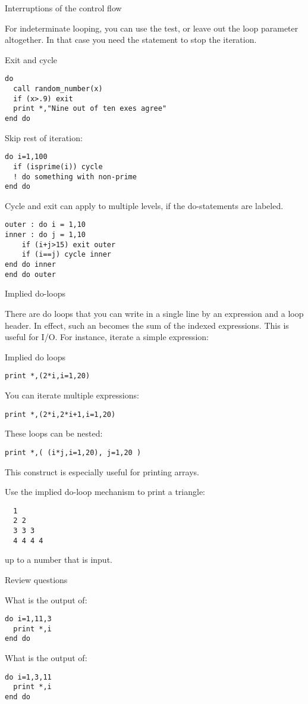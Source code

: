  {Interruptions of the control flow}

For indeterminate looping, you can use the  test,
or leave out the loop parameter altogether.
In that case you need the  statement to stop the iteration.

\begin{block}{Exit and cycle}
  \label{sl:loopexit}
\begin{verbatim}
do
  call random_number(x)
  if (x>.9) exit
  print *,"Nine out of ten exes agree"
end do
\end{verbatim}

Skip rest of iteration:
\begin{verbatim}
do i=1,100
  if (isprime(i)) cycle
  ! do something with non-prime
end do
\end{verbatim}
\end{block}

Cycle and exit can apply to multiple levels, if the do-statements are
labeled.

\begin{verbatim}
outer : do i = 1,10
inner : do j = 1,10
    if (i+j>15) exit outer
    if (i==j) cycle inner
end do inner
end do outer
\end{verbatim}

 {Implied do-loops}
\label{sec:f-impdo}

There are do loops that you can write in a single line by an
expression and a loop header. In effect, such an
 becomes the sum of the indexed
expressions. This is useful
for I/O. For instance, iterate a simple expression:

\begin{block}{Implied do loops}
  \label{sl:implieddo}
\begin{verbatim}
print *,(2*i,i=1,20)
\end{verbatim}
You can iterate multiple expressions:
\begin{verbatim}
print *,(2*i,2*i+1,i=1,20)
\end{verbatim}
These loops can be nested:
\begin{verbatim}
print *,( (i*j,i=1,20), j=1,20 )
\end{verbatim}
\end{block}

This construct is especially useful for printing arrays.

\begin{exercise}
  \label{ex:impl-triangle}
  Use the implied do-loop mechanism to print a triangle:
\begin{verbatim}
  1
  2 2
  3 3 3
  4 4 4 4
\end{verbatim}
  up to a number that is input.
\end{exercise}

 {Review questions}

\begin{exercise}
  \label{ex:floop-inf}
  What is the output of:
\begin{verbatim}
do i=1,11,3
  print *,i
end do
\end{verbatim}
What is the output of:
\begin{verbatim}
do i=1,3,11
  print *,i
end do
\end{verbatim}
\end{exercise}
